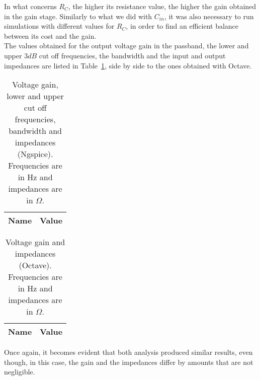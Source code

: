 In what concerns $R_C$, the higher its resistance value, the higher the gain obtained in the gain stage. Similarly to what we did with $C_{in}$, it was also necessary to run simulations with different values for $R_C$, in order to find an efficient balance between its cost and the gain. \\

The values obtained for the output voltage gain in the passband, the lower and upper $3dB$ cut off frequencies, the bandwidth and the input and output impedances are listed in Table~\ref{tab:spice}, side by side to the ones obtained with Octave.

\vspace{5mm}

\noindent
\begin{minipage}[c]{0.5\linewidth}

\begin{table}[H]
 \centering
 \begin{tabular}{|l|r|}
 \hline
 {\bf Name} & {\bf Value} \\ \hline


 \end{tabular}
 \caption{Voltage gain, lower and upper cut off frequencies, bandwidth and impedances (Ngspice). Frequencies are in Hz and impedances are in $\Omega$.}
 \label{tab:spice}
 \end{table}
 
\end{minipage}
\begin{minipage}[c]{0.5\linewidth}

\vspace{-5mm}
 
 \begin{table}[H]
 \centering
 \begin{tabular}{|l|r|}
 \hline
 {\bf Name} & {\bf Value} \\ \hline

 \end{tabular}
 \caption{Voltage gain and impedances (Octave). Frequencies are in Hz and impedances are in $\Omega$.}
 \label{tab:octave}
 \end{table}
 
\end{minipage}

\vspace{10mm}

Once again, it becomes evident that both analysis produced similar results, even though, in this case, the gain and the impedances differ by amounts that are not negligible. \\

